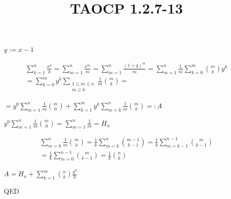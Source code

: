 \documentclass{article}
\title{TAOCP 1.2.7\mbox{-}13}
\begin{document}
\maketitle

\( y := x - 1 \)

\begin{multline*}
\sum_{k=1}^{n} \frac{x^{k}}{k} = \sum_{m=1}^{n} \frac{x^{m}}{m} = \sum_{m=1}^{n} \frac{{(1+y)}^{m}}{m} = \sum_{m=1}^{n} \frac{1}{m} \sum_{k=0}^{m} \binom{m}{k} y^{k} \\
= \sum_{k=0}^{m} y^{k} \sum_{\substack{1 \leq m \leq n\\m \geq k}} \frac{1}{m} \binom{m}{k} =
\end{multline*}

\( = y^{0} \sum_{m=1}^{n} \frac{1}{m}\binom{m}{0} + \sum_{k=1}^{m} y^{k} \sum_{m=k}^{n} \frac{1}{m} \binom{m}{k} =: A \)

\( y^{0} \sum_{m=1}^{n} \frac{1}{m}\binom{m}{0} = \sum_{m=1}^{n} \frac{1}{m} = H_{n} \)

\begin{multline*}
\sum_{m=k}^{n} \frac{1}{m} \binom{m}{k} = \frac{1}{k} \sum_{m=k}^{n} \binom{m-1}{k-1} = \frac{1}{k} \sum_{m=k-1}^{n-1} \binom{m}{k-1} \\
= \frac{1}{k} \sum_{m=0}^{n-1} \binom{m}{k-1} = \frac{1}{k} \binom{n}{k}
\end{multline*}

\( A = H_{n} + \sum_{k=1}^{m} \binom{n}{k}\frac{y^{k}}{k} \)

QED
\end{document}
